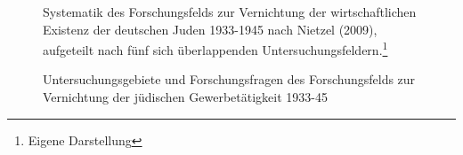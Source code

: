 \begin{figure}[h]
\centering
{}
\caption{Systematik des Forschungsfelds zur Vernichtung der wirtschaftlichen Existenz der deutschen Juden 1933-1945 nach Nietzel (2009), aufgeteilt nach fünf sich überlappenden Untersuchungsfeldern.\protect\footnote{Eigene Darstellung}}
\label{fig:x cubed graph}
\end{figure}

\begin{figure}[h]
\centering
{}
\caption{Untersuchungsgebiete und Forschungsfragen des Forschungsfelds zur Vernichtung der jüdischen Gewerbetätigkeit 1933-45}
\label{fig:x cubed graph}
\end{figure}